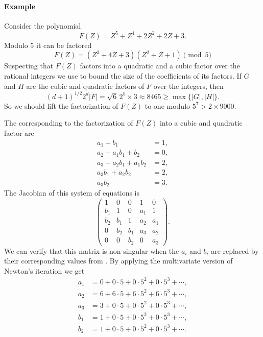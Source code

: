 {\paragraph{Example}

Consider the polynomial 
\[
F(Z) = Z^5 +Z^4 + 2Z^2 + 2Z + 3.
\]
Modulo $5$ it can be factored
\begin{equation}\label{Hensel:Ex5:Eq}
F(Z) = (Z^3 + 4Z + 3) (Z^2 + Z + 1) \pmod{5}
\end{equation}
Suspecting that $F(Z)$ factors into a quadratic and a cubic factor
over the rational integers we use  to
bound the size of the coefficients of its factors.  If $G$ and $H$ are
the cubic and quadratic factors of $F$ over the integers, then
\[
(d+1)^{1/2} 2^d |F| = \sqrt{6}\, 2^5\times 3 \approx 8465 \ge \max \{
|G|, |H|\}.
\]
So we should lift the factorization of $F(Z)$ to one modulo $5^7 > 2
\times 9000$.

The  corresponding to the factorization of
$F(Z)$ into a cubic and quadratic factor are
\begin{equation} \label{MNewton:Sing:Eq}
\begin{aligned}
a_1 + b_1 & = 1, \\
a_2 + a_1 b_1 + b_2 & = 0, \\
a_3 + a_2 b_1 + a_1 b_2 & = 2, \\
a_3 b_1 + a_2 b_2 & = 2, \\
a_3 b_2 & = 3.
\end{aligned}
\end{equation}
The Jacobian of this system of equations is 
\[
\left(
\begin{array}{ccccc}
1 & 0 & 0 & 1 & 0 \\
b_1 & 1 & 0 & a_1 & 1 \\
b_2 & b_1 & 1 & a_2 & a_1 \\
0   & b_2 & b_1 & a_3 & a_2 \\
0   & 0   & b_2 & 0   & a_3
\end{array}
\right).
\]
We can verify that this matrix is non-singular when the $a_i$ and
$b_i$ are replaced by their corresponding values from
.  By applying the multivariate version of Newton's
iteration  we get 
\[
\begin{aligned}
a_1 & = 0 + 0\cdot 5 + 0 \cdot 5^2 + 0 \cdot 5^3 + \cdots, \\
a_2 & = 6 + 6\cdot 5 + 6 \cdot 5^2 + 6 \cdot 5^3 + \cdots, \\
a_3 & = 3 + 0\cdot 5 + 0 \cdot 5^2 + 0 \cdot 5^3 + \cdots, \\
b_1 & = 1 + 0\cdot 5 + 0 \cdot 5^2 + 0 \cdot 5^3 + \cdots, \\
b_2 & = 1 + 0\cdot 5 + 0 \cdot 5^2 + 0 \cdot 5^3 + \cdots. \\
\end{aligned}
\]

}
